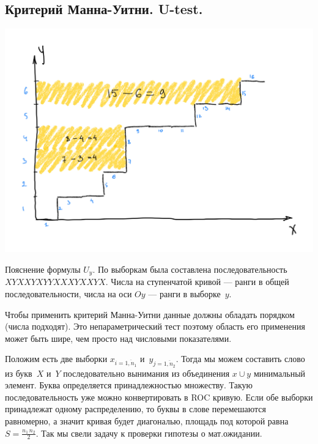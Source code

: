 \documentclass[a4paper, oneside]{book}
\begin{document}
\subsection{Критерий Манна-Уитни. U-test.}

\begin{marginfigure}
    \includegraphics[width=1.1\columnwidth]{pics/Uy_square.pdf}
    \label{fig:mann-whitney_roc}
    \caption{
        Пояснение формулы $U_y$. По выборкам была составлена последовательность
        $XYXXYXYYXXXYXXYX$. Числа на ступенчатой кривой --- ранги в общей
        последовательности, числа на оси $Oy$ --- ранги в выборке~$y$.
    }
\end{marginfigure}
Чтобы применить критерий Манна-Уитни данные должны обладать порядком (числа
подходят). Это непараметрический тест поэтому область его применения может быть
шире, чем просто над числовыми показателями.

Положим есть две выборки $x_{i=\overline{1, n_1}}$ и~$y_{j=\overline{1, n_2}}$.
Тогда мы можем составить слово из букв~$X$ и~$Y$ последовательно вынимания из
объединения $x \cup y$ минимальный элемент. Буква определяется принадлежностью
множеству. Такую последовательность уже можно конвертировать в ROC кривую. Если
обе выборки принадлежат одному распределению, то буквы в слове перемешаются
равномерно, а значит кривая будет диагональю, площадь под которой равна
$S=\frac{n_1\,n_2}{2}$. Так мы свели задачу к проверки гипотезы о мат.ожидании.
\end{document}

